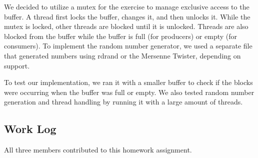 \documentclass[journal, letterpaper, draftclsnofoot, onecolumn, 10pt]{IEEEtran}
\begin{document}
We decided to utilize a mutex for the exercise to manage exclusive access to the buffer. A thread first locks the buffer, changes it,
and then unlocks it. While the mutex is locked, other threads are blocked until it is unlocked. Threads are also blocked from the buffer
while the buffer is full (for producers) or empty (for consumers). To implement the random number generator, we used a separate file that
generated numbers using rdrand or the Mersenne Twister, depending on support.

To test our implementation, we ran it with a smaller buffer to check if the blocks were occurring when the buffer was full or empty.
We also tested random number generation and thread handling by running it with a large amount of threads. 

\subsection{Work Log}
All three members contributed to this homework assignment.
\end{document}
